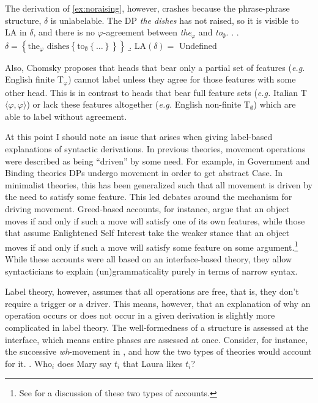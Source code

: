 \documentclass[MilwayThesis]{subfiles}
\begin{document}
The derivation of \ref{ex:noraising}, however, crashes because the phrase-phrase structure, $\delta$ is unlabelable.
The DP \textit{the dishes} has not raised, so it is visible to LA in $\delta$, and there is no $\varphi$-agreement between \textit{the}$_\varphi$ and \textit{to}$_\emptyset$.
\ex.
\a. $\delta = \left\{ \text{the}_\varphi \text{ dishes} \left\{ \text{to}_\emptyset \left\{ \ldots \right\}\right\} \right\}$
\b. LA$(\delta) = $ Undefined


Also, Chomsky proposes that heads that bear only a partial set of features (\textit{e.g.} English finite T$_\varphi$) cannot label unless they agree for those features with some other head.
This is in contrast to heads that bear full feature sets (\textit{e.g.} Italian T${\langle\varphi,\varphi\rangle}$) or lack these features altogether (\textit{e.g.} English non-finite T$_\emptyset$) which are able to label without agreement.

At this point I should note an issue that arises when giving label-based explanations of syntactic derivations.
In previous theories, movement operations were described as being ``driven'' by some need.
For example, in Government and Binding theories DPs undergo movement in order to get abstract Case.
In minimalist theories, this has been generalized such that all movement is driven by the need to satisfy some feature.
This led debates around the mechanism for driving movement. 
Greed-based accounts, for instance, argue that an object moves if and only if such a move will satisfy one of its own features, while those that assume Enlightened Self Interest take the weaker stance that an object moves if and only if such a move will satisfy some feature on some argument.\footnote{
	See \textcite{lasnik1999last} for a discussion of these two types of accounts.
}
While these accounts were all based on an interface-based theory, they allow syntacticians to explain (un)grammaticality purely in terms of narrow syntax.

Label theory, however, assumes that all operations are free, that is, they don't require a trigger or a driver.
This means, however, that an explanation of why an operation occurs or does not occur in a given derivation is slightly more complicated in label theory.
The well-formedness of a structure is assessed at the interface, which means entire phases are assessed at once.
Consider, for instance, the successive \textit{wh}-movement in \Next, and how the two types of theories would account for it.
\ex. Who$_i$ does Mary say $t_i$ that Laura likes $t_i$?
\end{document}
